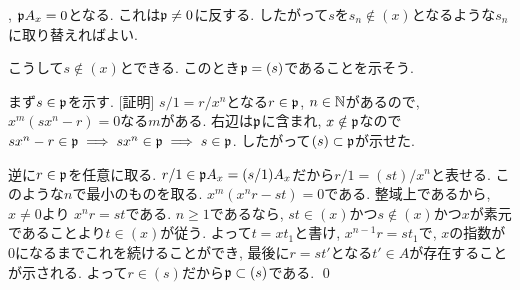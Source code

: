 {\begin{probans}
, $\mathfrak{p}A_{x} = 0$となる. これは$\mathfrak{p}\neq 0$に反する. したがって$s$を$s_n \notin (x)$となるような$s_n$に取り替えればよい. \par こうして$s\notin (x)$とできる. このとき$\mathfrak{p}=(s)$であることを示そう. \par
まず$s\in \mathfrak{p}$を示す. [証明] $s/1 = r/x^n$となる$r\in \mathfrak{p}$, $n\in \mathbb{N}$があるので, $x^m(sx^n - r) = 0$なる$m$がある. 右辺は$\mathfrak{p}$に含まれ, $x\notin \mathfrak{p}$なので$sx^n - r\in \mathfrak{p}\implies sx^n \in \mathfrak{p} \implies s\in \mathfrak{p}$. したがって$(s) \subset \mathfrak{p}$が示せた. \par
逆に$r\in \mathfrak{p}$を任意に取る. $r/1\in \mathfrak{p}A_{x} = (s/1)A_{x}$だから$r/1 = (st)/x^n$と表せる. このような$n$で最小のものを取る. $x^{m}(x^n r - st) = 0$である. 整域上であるから, $x\neq 0$より $x^n r = st$である. $n\geq 1$であるなら,  $st \in (x)$かつ$s\notin (x)$かつ$x$が素元であることより$t\in (x)$が従う. よって$t=xt_1$と書け, $x^{n-1}r = st_1$で, $x$の指数が0になるまでこれを続けることができ, 最後に$r = st'$となる$t' \in A$が存在することが示される. よって$r\in (s)$だから$\mathfrak{p}\subset (s)$である. \qed
\end{probans}

}



\newpage
